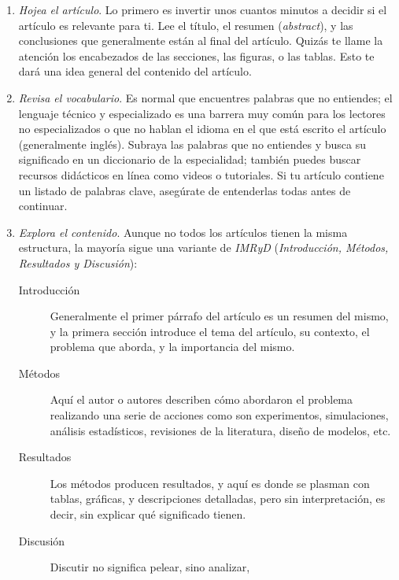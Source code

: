 \begin{enumerate}
    \item \emph{Hojea el artículo}. Lo primero es invertir unos cuantos minutos
          a decidir si el artículo es relevante para ti.
          Lee el título, el resumen (\emph{abstract}), y las conclusiones que
          generalmente están al final del artículo.
          Quizás te llame la atención los encabezados de las secciones, las
          figuras, o las tablas.
          Esto te dará una idea general del contenido del artículo.
    \item \emph{Revisa el vocabulario}. Es normal que encuentres palabras que no
          entiendes; el lenguaje técnico y especializado es una barrera muy común
          para los lectores no especializados o que no hablan el idioma en el que
          está escrito el artículo (generalmente inglés).
          Subraya las palabras que no entiendes y busca su significado en un
          diccionario de la especialidad; también puedes buscar recursos
          didácticos en línea como videos o tutoriales.
          Si tu artículo contiene un listado de palabras clave, asegúrate de
          entenderlas todas antes de continuar.
    \item \emph{Explora el contenido}. Aunque no todos los artículos tienen la
          misma estructura, la mayoría sigue una variante de \emph{IMRyD}
          (\emph{Introducción, Métodos, Resultados y Discusión}):
          \begin{description}
              \item[Introducción] Generalmente el primer párrafo del artículo es
                  un resumen del mismo, y la primera sección introduce el tema
                  del artículo, su contexto, el problema que aborda, y la
                  importancia del mismo.
              \item[Métodos] Aquí el autor o autores describen cómo abordaron el
                  problema realizando una serie de acciones como son
                  experimentos, simulaciones, análisis estadísticos, revisiones
                  de la literatura, diseño de modelos, etc.
              \item[Resultados] Los métodos producen resultados, y aquí es donde
                  se plasman con tablas, gráficas, y descripciones detalladas,
                  pero sin interpretación, es decir, sin explicar qué
                  significado tienen.
              \item[Discusión] Discutir no significa pelear, sino analizar,

\end{description}
\end{enumerate}
